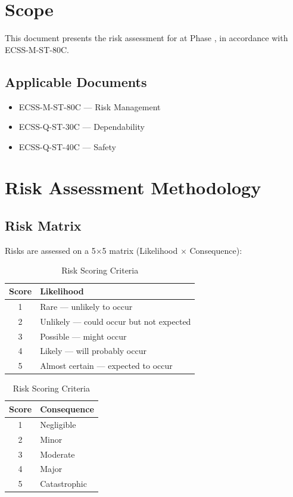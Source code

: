 
\section{Scope}
This document presents the risk assessment for  at Phase , in accordance with ECSS-M-ST-80C.

\subsection{Applicable Documents}
\begin{itemize}
\item ECSS-M-ST-80C — Risk Management
\item ECSS-Q-ST-30C — Dependability
\item ECSS-Q-ST-40C — Safety
\end{itemize}

\section{Risk Assessment Methodology}

\subsection{Risk Matrix}
Risks are assessed on a 5$\times$5 matrix (Likelihood $\times$ Consequence):

\begin{table}[H]
\centering
\caption{Risk Scoring Criteria}
\begin{tabular}{cl}
\toprule
\rowcolor{ecsslight}
\textbf{Score} & \textbf{Likelihood} \\
\midrule
1 & Rare — unlikely to occur \\
2 & Unlikely — could occur but not expected \\
3 & Possible — might occur \\
4 & Likely — will probably occur \\
5 & Almost certain — expected to occur \\
\bottomrule
\end{tabular}
\quad
\begin{tabular}{cl}
\toprule
\rowcolor{ecsslight}
\textbf{Score} & \textbf{Consequence} \\
\midrule
1 & Negligible \\
2 & Minor \\
3 & Moderate \\
4 & Major \\
5 & Catastrophic \\
\bottomrule
\end{tabular}
\end{table}


